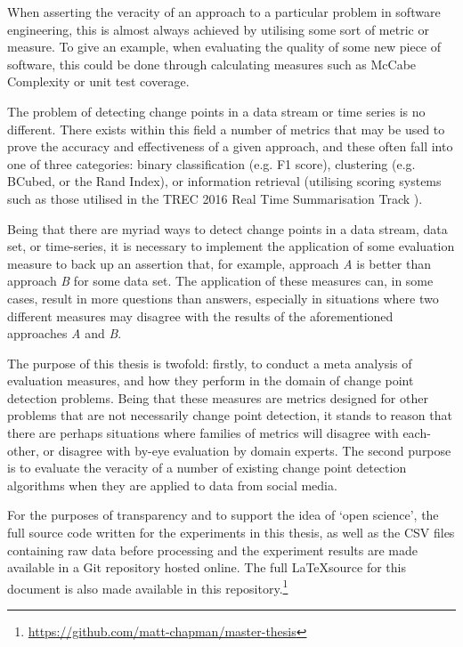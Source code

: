\documentclass[../main.tex]{subfiles}
\begin{document}
When asserting the veracity of an approach to a particular problem in software engineering, this is almost always achieved by utilising some sort of metric or measure. To give an example, when evaluating the quality of some new piece of software, this could be done through calculating measures such as McCabe Complexity \cite{ThomasJ.McCabe1976} or unit test coverage.

The problem of detecting change points in a data stream or time series is no different. There exists within this field a number of metrics that may be used to prove the accuracy and effectiveness of a given approach, and these often fall into one of three categories: binary classification (e.g. F1 score), clustering (e.g. BCubed, or the Rand Index), or information retrieval (utilising scoring systems such as those utilised in the TREC 2016 Real Time Summarisation Track \cite{trec2016}).

Being that there are myriad ways to detect change points in a data stream, data set, or time-series, it is necessary to implement the application of some evaluation measure to back up an assertion that, for example, approach \emph{A} is better than approach \emph{B} for some data set. The application of these measures can, in some cases, result in more questions than answers, especially in situations where two different measures may disagree with the results of the aforementioned approaches \emph{A} and \emph{B}.

The purpose of this thesis is twofold: firstly, to conduct a meta analysis of evaluation measures, and how they perform in the domain of change point detection problems. Being that these measures are metrics designed for other problems that are not necessarily change point detection, it stands to reason that there are perhaps situations where families of metrics will disagree with each-other, or disagree with by-eye evaluation by domain experts. The second purpose is to evaluate the veracity of a number of existing change point detection algorithms when they are applied to data from social media.

For the purposes of transparency and to support the idea of `open science', the full source code written for the experiments in this thesis, as well as the CSV files containing raw data before processing and the experiment results are made available in a Git repository hosted online. The full \LaTeX source for this document is also made available in this repository.\footnote{\url{https://github.com/matt-chapman/master-thesis}}
\end{document}
